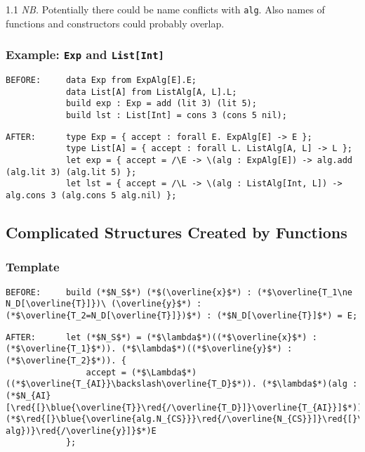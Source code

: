 \documentclass{article}
\newcommand{\red}[1]{\textcolor{red}{#1}}
\newcommand{\blue}[1]{\textcolor{blue}{#1}}
\newcommand{\nb}{\textit{NB. }}
\begin{document}
\begin{spacing}{1.1}
\nb Potentially there could be name conflicts with \lstinline{alg}. Also names of functions and constructors could probably overlap.

\subsubsection{Example: \lstinline{Exp} and \lstinline{List[Int]}}

\begin{lstlisting}[numbers=none]
BEFORE:     data Exp from ExpAlg[E].E;
            data List[A] from ListAlg[A, L].L;
            build exp : Exp = add (lit 3) (lit 5);
            build lst : List[Int] = cons 3 (cons 5 nil);
\end{lstlisting}
\begin{lstlisting}[numbers=none]
AFTER:      type Exp = { accept : forall E. ExpAlg[E] -> E };
            type List[A] = { accept : forall L. ListAlg[A, L] -> L };
            let exp = { accept = /\E -> \(alg : ExpAlg[E]) -> alg.add (alg.lit 3) (alg.lit 5) };
            let lst = { accept = /\L -> \(alg : ListAlg[Int, L]) -> alg.cons 3 (alg.cons 5 alg.nil) };
\end{lstlisting}

\subsection{Complicated Structures Created by Functions}

\subsubsection{Template}

\begin{lstlisting}[numbers=none]
BEFORE:     build (*$N_S$*) (*$(\overline{x}$*) : (*$\overline{T_1\ne N_D[\overline{T}]})\ (\overline{y}$*) : (*$\overline{T_2=N_D[\overline{T}]})$*) : (*$N_D[\overline{T}]$*) = E;
\end{lstlisting}
\begin{lstlisting}[numbers=none]
AFTER:      let (*$N_S$*) = (*$\lambda$*)((*$\overline{x}$*) : (*$\overline{T_1}$*)). (*$\lambda$*)((*$\overline{y}$*) : (*$\overline{T_2}$*)). {
                accept = (*$\Lambda$*)((*$\overline{T_{AI}}\backslash\overline{T_D}$*)). (*$\lambda$*)(alg : (*$N_{AI}[\red{[}\blue{\overline{T}}\red{/\overline{T_D}]}\overline{T_{AI}}]$*)). (*$\red{[}\blue{\overline{alg.N_{CS}}}\red{/\overline{N_{CS}}]}\red{[}\blue{(\overline{y.accept[\overline{T_{AI}}\backslash\overline{T_D}]\ alg})}\red{/\overline{y}]}$*)E
            };
\end{lstlisting}


\end{spacing}
\end{document}
